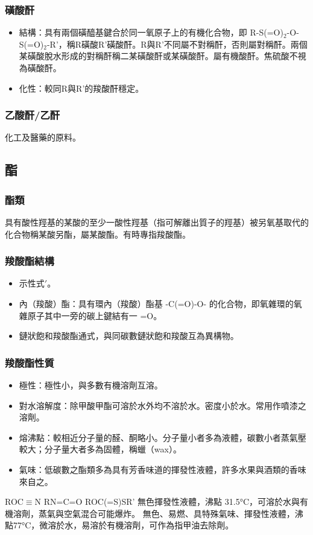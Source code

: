 \documentclass[a4paper,12pt]{report}
\begin{document}
\begin{itemize}
\subsubsection{磺酸酐}
\begin{itemize}
\item 結構：具有兩個磺醯基鍵合於同一氧原子上的有機化合物，即 R-S(=O)$_2$-O-S(=O)$_2$-R'，稱R磺酸R'磺酸酐。R與R'不同屬不對稱酐，否則屬對稱酐。兩個某磺酸脫水形成的對稱酐稱二某磺酸酐或某磺酸酐。屬有機酸酐。焦硫酸不視為磺酸酐。
\item 化性：較同R與R'的羧酸酐穩定。
\end{itemize}
\subsubsection{乙酸酐/乙酐}
化工及醫藥的原料。
\subsection{酯}
\subsubsection{酯類}
具有酸性羥基的某酸的至少一酸性羥基（指可解離出質子的羥基）被另氧基取代的化合物稱某酸另酯，屬某酸酯。有時專指羧酸酯。
\subsubsection{羧酸酯結構}
\begin{itemize}
\item 示性式$'$。
\item 內（羧酸）酯：具有環內（羧酸）酯基 -C(=O)-O- 的化合物，即氧雜環的氧雜原子其中一旁的碳上鍵結有一 =O。
\item 鏈狀飽和羧酸酯通式，與同碳數鏈狀飽和羧酸互為異構物。
\end{itemize}
\subsubsection{羧酸酯性質}
\begin{itemize}
\item 極性：極性小，與多數有機溶劑互溶。
\item 對水溶解度：除甲酸甲酯可溶於水外均不溶於水。密度小於水。常用作噴漆之溶劑。
\item 熔沸點：較相近分子量的醛、酮略小。分子量小者多為液體，碳數小者蒸氣壓較大；分子量大者多為固體，稱蠟（wax）。
\item 氣味：低碳數之酯類多為具有芳香味道的揮發性液體，許多水果與酒類的香味來自之。
\end{itemize}
ROC$\equiv$N
RN=C=O
ROC(=S)SR'
無色揮發性液體，沸點 31.5°C，可溶於水與有機溶劑，蒸氣與空氣混合可能爆炸。
無色、易燃、具特殊氣味、揮發性液體，沸點77°C，微溶於水，易溶於有機溶劑，可作為指甲油去除劑。

\end{itemize}
\end{document}
